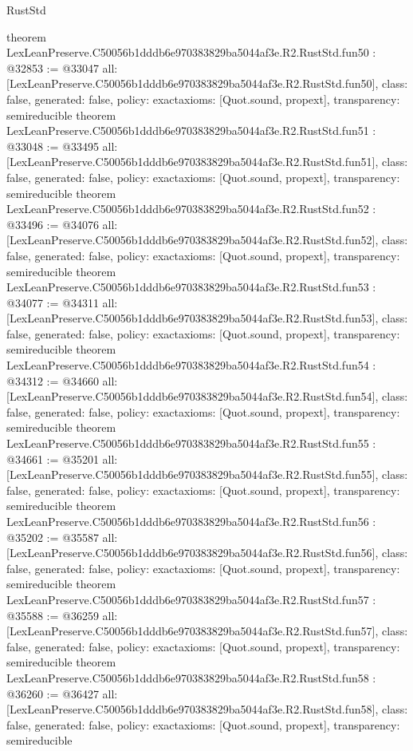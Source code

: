 \begin{lexlean}{RustStd}
\begin{coremodule}
{}
theorem LexLeanPreserve.C50056b1dddb6e970383829ba5044af3e.R2.RustStd.fun50 : @32853 := @33047 {
  all: [LexLeanPreserve.C50056b1dddb6e970383829ba5044af3e.R2.RustStd.fun50],
  class: false,
  generated: false,
  policy: exact{axioms: [Quot.sound, propext]},
  transparency: semireducible
}
theorem LexLeanPreserve.C50056b1dddb6e970383829ba5044af3e.R2.RustStd.fun51 : @33048 := @33495 {
  all: [LexLeanPreserve.C50056b1dddb6e970383829ba5044af3e.R2.RustStd.fun51],
  class: false,
  generated: false,
  policy: exact{axioms: [Quot.sound, propext]},
  transparency: semireducible
}
theorem LexLeanPreserve.C50056b1dddb6e970383829ba5044af3e.R2.RustStd.fun52 : @33496 := @34076 {
  all: [LexLeanPreserve.C50056b1dddb6e970383829ba5044af3e.R2.RustStd.fun52],
  class: false,
  generated: false,
  policy: exact{axioms: [Quot.sound, propext]},
  transparency: semireducible
}
theorem LexLeanPreserve.C50056b1dddb6e970383829ba5044af3e.R2.RustStd.fun53 : @34077 := @34311 {
  all: [LexLeanPreserve.C50056b1dddb6e970383829ba5044af3e.R2.RustStd.fun53],
  class: false,
  generated: false,
  policy: exact{axioms: [Quot.sound, propext]},
  transparency: semireducible
}
theorem LexLeanPreserve.C50056b1dddb6e970383829ba5044af3e.R2.RustStd.fun54 : @34312 := @34660 {
  all: [LexLeanPreserve.C50056b1dddb6e970383829ba5044af3e.R2.RustStd.fun54],
  class: false,
  generated: false,
  policy: exact{axioms: [Quot.sound, propext]},
  transparency: semireducible
}
theorem LexLeanPreserve.C50056b1dddb6e970383829ba5044af3e.R2.RustStd.fun55 : @34661 := @35201 {
  all: [LexLeanPreserve.C50056b1dddb6e970383829ba5044af3e.R2.RustStd.fun55],
  class: false,
  generated: false,
  policy: exact{axioms: [Quot.sound, propext]},
  transparency: semireducible
}
theorem LexLeanPreserve.C50056b1dddb6e970383829ba5044af3e.R2.RustStd.fun56 : @35202 := @35587 {
  all: [LexLeanPreserve.C50056b1dddb6e970383829ba5044af3e.R2.RustStd.fun56],
  class: false,
  generated: false,
  policy: exact{axioms: [Quot.sound, propext]},
  transparency: semireducible
}
theorem LexLeanPreserve.C50056b1dddb6e970383829ba5044af3e.R2.RustStd.fun57 : @35588 := @36259 {
  all: [LexLeanPreserve.C50056b1dddb6e970383829ba5044af3e.R2.RustStd.fun57],
  class: false,
  generated: false,
  policy: exact{axioms: [Quot.sound, propext]},
  transparency: semireducible
}
theorem LexLeanPreserve.C50056b1dddb6e970383829ba5044af3e.R2.RustStd.fun58 : @36260 := @36427 {
  all: [LexLeanPreserve.C50056b1dddb6e970383829ba5044af3e.R2.RustStd.fun58],
  class: false,
  generated: false,
  policy: exact{axioms: [Quot.sound, propext]},
  transparency: semireducible
}
\end{coremodule}
\end{lexlean}
